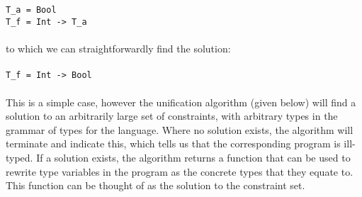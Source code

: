\documentclass{article}
\begin{document}
\\\\
\indent \texttt{T\_a = Bool} \\
\indent \texttt{T\_f = Int -> T\_a}
\\\\
to which we can straightforwardly find the solution:
\\\\
\indent \texttt{T\_f = Int -> Bool}
\\\\
This is a simple case, however the unification algorithm (given below) will find a solution to an arbitrarily large set of constraints, with arbitrary types in the grammar of types for the language. Where no solution exists, the algorithm will terminate and indicate this, which tells us that the corresponding program is ill-typed. If a solution exists, the algorithm returns a function that can be used to rewrite type variables in the program as the concrete types that they equate to. This function can be thought of as the solution to the constraint set.
\pagebreak
\end{document}

